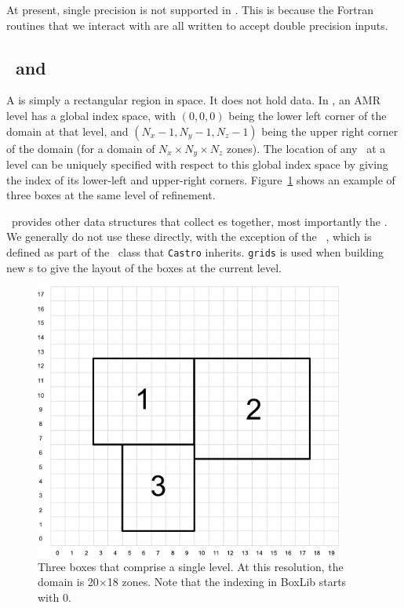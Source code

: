 At present, single precision is not supported in \castro.  This is
because the Fortran routines that we interact with are all written to
accept double precision inputs.

\subsection{\bbox\ and \farraybox}

A \code{\bbox} is simply a rectangular region in space.  It does not hold
data.  In \boxlib, an AMR level has a global index space, with
$(0,0,0)$ being the lower left corner of the domain at that level, and
$(N_x-1, N_y-1, N_z-1)$ being the upper right corner of the domain
(for a domain of $N_x \times N_y \times N_z$ zones).  The location of
any \bbox\ at a level can be uniquely specified with respect to this
global index space by giving the index of its lower-left and
upper-right corners.  Figure~\ref{fig:soft:indexspace} shows an
example of three boxes at the same level of refinement.

\boxlib\ provides other data structures that collect \bbox es together,
most importantly the \code{\boxarray}.  We generally do not use these
directly, with the exception of the \boxarray\ ,
which is defined as part of the \amrlevel\ class that {\tt Castro}
inherits. {\tt grids} is used when building new \multifab s to give
the layout of the boxes at the current level.

\begin{figure}[t]
\centering
\includegraphics[width=4.0in]{index_grid2}
\caption[Single-level grid structure]
{\label{fig:soft:indexspace} Three boxes that comprise a single level.  At this
  resolution, the domain is 20$\times$18 zones.  Note that the
  indexing in BoxLib starts with $0$.}
\end{figure}


